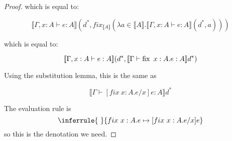 \begin{proof}
which is equal to:

\[\llbracket \Gamma, x : A \vdash e : A \rrbracket(d^*, fix_{\llbracket A \rrbracket} (\lambda a \in \llbracket A \rrbracket . \llbracket \Gamma, x : A \vdash e : A \rrbracket(d^*, a)))
\]

which is equal to:

\[\llbracket \Gamma, x : A \vdash e : A \rrbracket(d^*, \llbracket \Gamma \vdash \operatorname{fix} \ x:A .e : A \rrbracket d^*)
\]

Using the substitution lemma, this is the same as

\[\llbracket \Gamma \vdash [fix \ x:A.e/x] e : A \rrbracket d^* \]
 
 
The evaluation rule is 
$$
\inferrule{ \ }
{fix \ x:A. e \mapsto [fix \ x:A. e/x]e}
$$
so this is the denotation we need.
\end{proof}